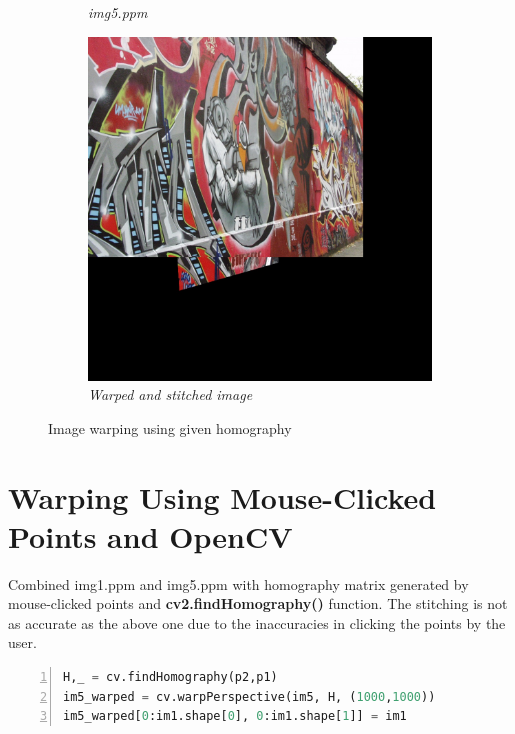 \documentclass[11pt, a4paper]{article}
\begin{document}
\begin{figure}[H]
\begin{subfigure}[b]{0.32\textwidth}
		\caption{{\small \textit{img5.ppm}}}
		\label{fig:2im5}
	\end{subfigure}
	\hfill
	\begin{subfigure}[b]{0.32\textwidth}
		\centering
		\includegraphics[width=\textwidth]{./images/Q2im1Warp.jpg}
		\caption{{\small \textit{Warped and stitched image}}}
		\label{fig:2imw}
	\end{subfigure}
	\caption{Image warping using given homography}
\end{figure}

\section{Warping Using Mouse-Clicked Points and OpenCV}
Combined img1.ppm and img5.ppm with homography matrix generated by mouse-clicked points and \textbf{cv2.findHomography()} function. The stitching is not as accurate as the above one due to the inaccuracies in clicking the points by the user.

\begin{lstlisting}[numbers=left,frame=single,language=python,caption=Calculating homography using OpenCV and stitching]
H,_ = cv.findHomography(p2,p1)
im5_warped = cv.warpPerspective(im5, H, (1000,1000))
im5_warped[0:im1.shape[0], 0:im1.shape[1]] = im1
\end{lstlisting}
\end{document}

